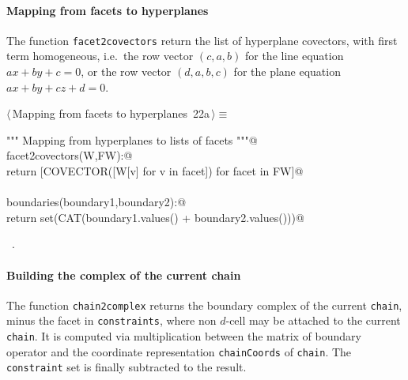 \documentclass[11pt,oneside]{article}	%
\begin{document}
\paragraph{Mapping from facets to hyperplanes}
The function \texttt{facet2covectors} return the list of hyperplane covectors, with first term homogeneous, i.e.~the row vector $(c,a,b)$ for the line equation $ax+by+c=0$, or the row vector $(d,a,b,c)$ for the plane equation $ax+by+cz+d=0$.
\begin{flushleft} \small \label{scrap25}
\protect{}$\langle\,$Mapping from facets to hyperplanes\nobreak\ {\footnotesize 22a}$\,\rangle\equiv$
\vspace{-1ex}
\begin{list}{}{} \item
\mbox{}\verb@""" Mapping from hyperplanes to lists of facets """@\\
\mbox{}\verb@def facet2covectors(W,FW):@\\
\mbox{}\verb@   return [COVECTOR([W[v] for v in facet]) for facet in FW]@\\
\mbox{}\verb@@\\
\mbox{}\verb@def boundaries(boundary1,boundary2):@\\
\mbox{}\verb@   return set(CAT(boundary1.values() + boundary2.values()))@\\
\mbox{}\verb@@{\NWsep}
\end{list}
\vspace{-1ex}
\footnotesize\addtolength{\baselineskip}{-1ex}
\begin{list}{}{\setlength{\itemsep}{-\parsep}\setlength{\itemindent}{-\leftmargin}}
\item \NWtxtMacroRefIn\ .
\end{list}
\end{flushleft}

\paragraph{Building the complex of the current chain}
The function \texttt{chain2complex} returns the boundary complex of the current \texttt{chain}, minus the facet in \texttt{constraints}, where non $d$-cell may be attached to the current \texttt{chain}.
It is computed via multiplication between the matrix of boundary operator and the coordinate representation \texttt{chainCoords} of \texttt{chain}. The \texttt{constraint} set is finally subtracted to the result.  
\end{document}
